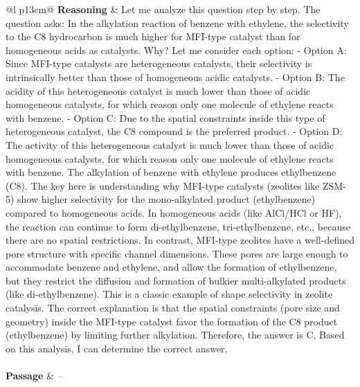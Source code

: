 \begin{longtable}{@{}l p{13cm}@{}}
  \textbf{Reasoning} & Let me analyze this question step by step. \newline The question asks: In the alkylation reaction of benzene with ethylene, the selectivity to the C8 hydrocarbon is much higher for MFI-type catalyst than for homogeneous acids as catalysts. Why? \newline Let me consider each option: \newline - Option A: Since MFI-type catalysts are heterogeneous catalysts, their selectivity is intrinsically better than those of homogeneous acidic catalysts. \newline - Option B: The acidity of this heterogeneous catalyst is much lower than those of acidic homogeneous catalysts, for which reason only one molecule of ethylene reacts with benzene. \newline - Option C: Due to the spatial constraints inside this type of heterogeneous catalyst, the C8 compound is the preferred product. \newline - Option D: The activity of this heterogeneous catalyst is much lower than those of acidic homogeneous catalysts, for which reason only one molecule of ethylene reacts with benzene. \newline The alkylation of benzene with ethylene produces ethylbenzene (C8). The key here is understanding why MFI-type catalysts (zeolites like ZSM-5) show higher selectivity for the mono-alkylated product (ethylbenzene) compared to homogeneous acids. In homogeneous acids (like AlCl/HCl or HF), the reaction can continue to form di-ethylbenzene, tri-ethylbenzene, etc., because there are no spatial restrictions. In contrast, MFI-type zeolites have a well-defined pore structure with specific channel dimensions. These pores are large enough to accommodate benzene and ethylene, and allow the formation of ethylbenzene, but they restrict the diffusion and formation of bulkier multi-alkylated products (like di-ethylbenzene). This is a classic example of shape selectivity in zeolite catalysis. The correct explanation is that the spatial constraints (pore size and geometry) inside the MFI-type catalyst favor the formation of the C8 product (ethylbenzene) by limiting further alkylation. Therefore, the answer is C. \newline Based on this analysis, I can determine the correct answer.  \\
  \midrule
   \\
  \textbf{Passage}   & \textit{--}    \\

\end{longtable}
